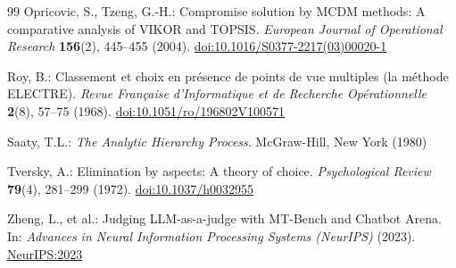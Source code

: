 \documentclass[pdflatex,sn-mathphys-num]{sn-jnl}
\theoremstyle{thmstyleone}
\theoremstyle{thmstylethree}
\begin{document}
\begin{thebibliography}{99}
Opricovic, S., Tzeng, G.-H.: Compromise solution by MCDM methods: A comparative analysis of VIKOR and TOPSIS. \emph{European Journal of Operational Research} \textbf{156}(2), 445--455 (2004). \href{https://doi.org/10.1016/S0377-2217(03)00020-1}{doi:10.1016/S0377-2217(03)00020-1}

Roy, B.: Classement et choix en pr\'esence de points de vue multiples (la m\'ethode ELECTRE). \emph{Revue Fran\c{c}aise d'Informatique et de Recherche Op\'erationnelle} \textbf{2}(8), 57--75 (1968). \href{https://doi.org/10.1051/ro/196802V100571}{doi:10.1051/ro/196802V100571}

Saaty, T.L.: \emph{The Analytic Hierarchy Process}. McGraw-Hill, New York (1980)

Tversky, A.: Elimination by aspects: A theory of choice. \emph{Psychological Review} \textbf{79}(4), 281--299 (1972). \href{https://doi.org/10.1037/h0032955}{doi:10.1037/h0032955}

Zheng, L., et al.: Judging LLM-as-a-judge with MT-Bench and Chatbot Arena. In: \emph{Advances in Neural Information Processing Systems (NeurIPS)} (2023). \href{https://proceedings.neurips.cc/paper_files/paper/2023/hash/91f18a1287b30030061e38b76c8c4599-Abstract-Conference.html}{NeurIPS:2023}

\end{thebibliography}
\end{document}

